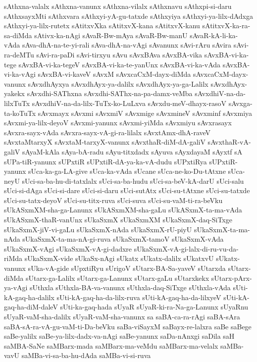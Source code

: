 {sAthxna-valalx
sAthxna-vanunx
sAthxna-vilalx
sAthxnavu
sAthxpi-si-daru
sAthxsayxMti
sAthxvara
sAthxyi-yA-gu-tatxde
sAthxyiya
sAthxyi-ya-lilx-dAdxga
sAthxyi-ya-lilx-rutetx
sAtitxvXka
sAtitxvX-kana
sAtitxvX-kanu
sAtitxvX-ka-ra-sa-diMda
sAtivx-ka-nAgi
sAvaR-Bw-mAya
sAvaR-Bw-manU
sAvaR-kA-li-ka-vAda
sAva-dhA-na-te-yi-rali
sAva-dhA-na-vAgi
sAvanunx
sAvi-rAru
sAvira
sAvi-ra-deMTu
sAvi-ra-paDi
sAvi-tirxyu
sAvu
sAvxBAva
sAvxBA-vika
sAvxBA-vi-ka-tege
sAvxBA-vi-ka-tegeV
sAvxBA-vi-ka-te-yanUnx
sAvxBA-vi-ka-vAda
sAvxBA-vi-ka-vAgi
sAvxBA-vi-kaveV
sAvxM
sAvxcaCxM-dayx-diMda
sAvxcaCxM-dayx-vanunx
sAvxdhAyxya
sAvxdhAyx-ya-dalilx
sAvxdhAyx-ya-ga-Lalilx
sAvxdhAyx-yakekx
sAvxdhi-SAThxna
sAvxdhi-SAThx-na-pa-damx-veMba
sAvxdhiV-na-da-lilxTuTx
sAvxdhiV-na-da-lilx-TuTx-ko-LuLxva
sAvxdu-meV-dhayx-rasoV
sAvxga-ta-koTuTx
sAvxmayx
sAvxmi
sAvxmiV
sAvxmige
sAvxmineV
sAvxminf
sAvxmiya
sAvxmi-ya-lilx-deyoV
sAvxmi-yanunx
sAvxmi-yiMda
sAvxmiyu
sAvxrasayx
sAvxra-sayx-vAda
sAvxra-sayx-vA-gi-ra-lilalx
sAvxtAmx-dhA-raveV
sAvxtaMtarxyX
sAvxtaM-tarxyX-vanunx
sAvxthaR-diM-dA-galiV
sAvxthaR-vA-galiV
sAyaM-kAla
sAya-bA-radu
sAyu-titxdadx
sAyuva
sAyxdayaM
sAyxtf
sA‌
sUPa-tiR-yanunx
sUPxtiR
sUPxtiR-dA-ya-ka-vA-dudu
sUPxtiRya
sUPxtiR-yanunx
sUca-ka-ga-LA-give
sUca-ka-vAda
sUcane
sUca-ne-ko-Du-tAtxne
sUca-neyU
sUci-sa-ba-hu-di-tatxlalx
sUci-sa-ba-hudu
sUci-sa-beV-kA-darU
sUci-salu
sUci-si-dAga
sUci-si-dare
sUci-si-daru
sUci-sutAtx
sUci-su-tAtxne
sUci-su-tatxde
sUci-su-tatx-deyoV
sUci-su-titx-ruva
sUci-suva
sUci-su-vaM-ti-ra-beVku
sUkASxmXM-sha-ga-Lanunx
sUkASxmXM-sha-gaLu
sUkASxmX-ta-ma-vAda
sUkASxmX-thaR-vanUnx
sUkaSxmX
sUkaSxmXM
sUkaSxmX-daq-SiTxge
sUkaSxmX-jiV-vi-gaLu
sUkaSxmX-nAda
sUkaSxmX-rU-piyU
sUkaSxmX-ta-ma-nAda
sUkaSxmX-ta-ma-nA-gi-ruva
sUkaSxmX-tamoV
sUkaSxmX-vAda
sUkaSxmX-vAgi
sUkaSxmX-vA-gi-dadxre
sUkaSxmX-vA-gi-lalx-di-ru-vu-da-riMda
sUkaSxmX-vide
sUkaSx-nAgi
sUkatx
sUkatx-dalilx
sUkatxvU
sUkatx-vanunx
sUka-vA-gide
sUpxtiRyu
sUrigoV
sUtarx-BA-Sa-yaveV
sUtarxda
sUtarx-diMda
sUtarx-ga-Lalilx
sUtarx-ga-Lanunx
sUtarx-gaLu
sUtarxkekx
sUtarx-pArx-ya-vAgi
sUthxla
sUthxla-BA-va-vanunx
sUthxla-daq-SiTxge
sUthxla-vAda
sUti-kA-gaq-ha-dalilx
sUti-kA-gaq-ha-da-lilx-ruva
sUti-kA-gaq-ha-da-lilxyeV
sUti-kA-gaq-ha-diM-daleV
sUti-ka-gaq-hada
sUyaR
sUyaR-ki-ra-Na-ga-Lanunx
sUyaRnu
sUyaR-vaM-sha-dalilx
sUyaR-vaM-sha-vanunx
sa
saBA-ca-ra-rAgi
saBA-sAra
saBA-sA-ra-vA-gu-vaM-ti-Da-beVku
saBa-viSayxM
saBayx-re-lalxra
saBe
saBege
saBe-yalilx
saBe-ya-lilx-dadx-va-nAgi
saBe-yanunx
saDa-nAnxgi
saDila
saH
saMBA-SaNe
saMBarx-mada
saMBarx-ma-veMdu
saMBarx-ma-velalx
saMBa-vavU
saMBa-vi-sa-ba-hu-dAda
saMBa-vi-si-ruva
}
